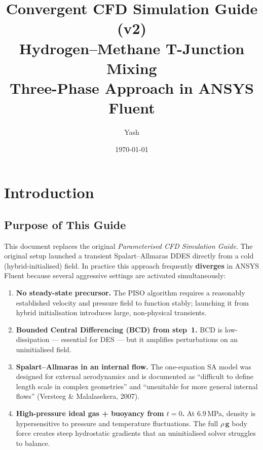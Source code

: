 \documentclass[12pt,a4paper]{report}
\title{\textbf{Convergent CFD Simulation Guide (v2)}\\[6pt]
       \Large Hydrogen--Methane T-Junction Mixing\\
       Three-Phase Approach in ANSYS Fluent}
\author{Yash}
\date{\today}
\begin{document}
\maketitle
\thispagestyle{empty}
\tableofcontents
\newpage


\chapter{Introduction}
\label{ch:intro}

\section{Purpose of This Guide}

This document replaces the original \emph{Parameterised CFD Simulation
Guide}.  The original setup launched a transient Spalart--Allmaras DDES
directly from a cold (hybrid-initialised) field.  In practice this
approach frequently \textbf{diverges} in ANSYS Fluent because several
aggressive settings are activated simultaneously:

\begin{enumerate}
  \item \textbf{No steady-state precursor.}  The PISO algorithm
        requires a reasonably established velocity and pressure field
        to function stably; launching it from hybrid initialisation
        introduces large, non-physical transients.
  \item \textbf{Bounded Central Differencing (BCD) from step~1.}
        BCD is low-dissipation --- essential for DES --- but it
        amplifies perturbations on an uninitialised field.
  \item \textbf{Spalart--Allmaras in an internal flow.}  The
        one-equation SA model was designed for external aerodynamics
        and is documented as ``difficult to define length scale in
        complex geometries'' and ``unsuitable for more general
        internal flows'' (Versteeg \& Malalasekera, 2007).
  \item \textbf{High-pressure ideal gas + buoyancy from $t=0$.}  At
        6.9\,MPa, density is hypersensitive to pressure and
        temperature fluctuations.  The full $\rho\,\mathbf{g}$ body
        force creates steep hydrostatic gradients that an
        uninitialised solver struggles to balance.
\end{enumerate}
\end{document}
